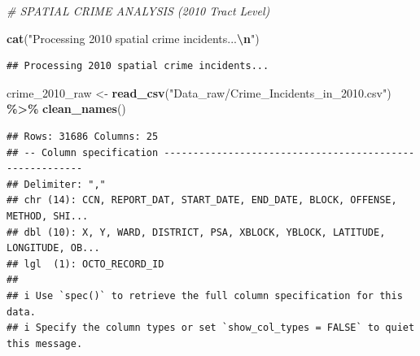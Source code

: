 \documentclass[
]{article}
\newenvironment{Shaded}{\begin{snugshade}}{\end{snugshade}}
\newcommand{\CommentTok}[1]{\textcolor[rgb]{0.56,0.35,0.01}{\textit{#1}}}
\newcommand{\FunctionTok}[1]{\textcolor[rgb]{0.13,0.29,0.53}{\textbf{#1}}}
\newcommand{\NormalTok}[1]{#1}
\newcommand{\OtherTok}[1]{\textcolor[rgb]{0.56,0.35,0.01}{#1}}
\newcommand{\SpecialCharTok}[1]{\textcolor[rgb]{0.81,0.36,0.00}{\textbf{#1}}}
\newcommand{\StringTok}[1]{\textcolor[rgb]{0.31,0.60,0.02}{#1}}
\begin{document}
\begin{Shaded}
\begin{Highlighting}[]
\CommentTok{\# SPATIAL CRIME ANALYSIS (2010 Tract Level)}

\FunctionTok{cat}\NormalTok{(}\StringTok{"Processing 2010 spatial crime incidents...}\SpecialCharTok{\textbackslash{}n}\StringTok{"}\NormalTok{)}
\end{Highlighting}
\end{Shaded}

\begin{verbatim}
## Processing 2010 spatial crime incidents...
\end{verbatim}

\begin{Shaded}
\begin{Highlighting}[]
\NormalTok{crime\_2010\_raw }\OtherTok{\textless{}{-}} \FunctionTok{read\_csv}\NormalTok{(}\StringTok{"Data\_raw/Crime\_Incidents\_in\_2010.csv"}\NormalTok{) }\SpecialCharTok{\%\textgreater{}\%} \FunctionTok{clean\_names}\NormalTok{()}
\end{Highlighting}
\end{Shaded}

\begin{verbatim}
## Rows: 31686 Columns: 25
## -- Column specification --------------------------------------------------------
## Delimiter: ","
## chr (14): CCN, REPORT_DAT, START_DATE, END_DATE, BLOCK, OFFENSE, METHOD, SHI...
## dbl (10): X, Y, WARD, DISTRICT, PSA, XBLOCK, YBLOCK, LATITUDE, LONGITUDE, OB...
## lgl  (1): OCTO_RECORD_ID
## 
## i Use `spec()` to retrieve the full column specification for this data.
## i Specify the column types or set `show_col_types = FALSE` to quiet this message.
\end{verbatim}
\end{document}

